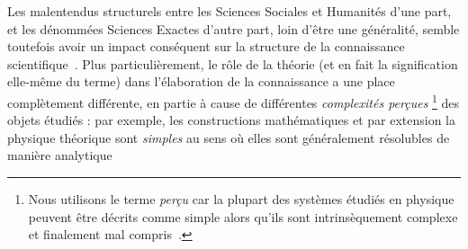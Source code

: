 {}{
Les malentendus structurels entre les Sciences Sociales et Humanités d'une part, et les dénommées Sciences Exactes d'autre part, 
loin d'être une généralité, 
semble toutefois avoir un impact conséquent sur la structure de la connaissance scientifique~\cite{2015arXiv151103981H}. 
Plus particulièrement, le rôle de la théorie (et en fait la signification elle-même du terme) dans l'élaboration de la connaissance a une place complètement différente, en partie à cause de différentes \emph{complexités perçues}
\footnote{Nous utilisons le terme \emph{perçu} car la plupart des systèmes étudiés en physique peuvent être décrits comme simple alors qu'ils sont intrinsèquement complexe et finalement mal compris~\cite{laughlin2006different}.} des objets étudiés : par exemple, les constructions mathématiques et par extension la physique théorique sont \emph{simples} au sens où elles sont généralement résolubles de manière analytique 
}
